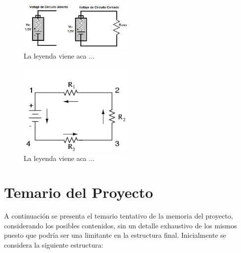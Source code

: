 \documentclass[12pt,letterpaper]{article}
\begin{document}
\begin{figure}[h!] 
\centering
\includegraphics[width=0.5\textwidth]{esquema1}
\caption{La leyenda viene aca ...}
\label{fig:esquema1}
\end{figure}


\begin{figure}[h!] 
\centering
\includegraphics[width=0.5\textwidth]{esquema2}
\caption{La leyenda viene aca ...}
\label{fig:esquema2}
\end{figure}







 
 





\section{Temario del Proyecto}
A continuación se presenta el temario tentativo de la memoria del proyecto, considerando los posibles contenidos, sin un detalle exhaustivo de los mismos puesto que podría ser una limitante en la estructura final. Inicialmente se considera la siguiente estructura:\\
\end{document}
